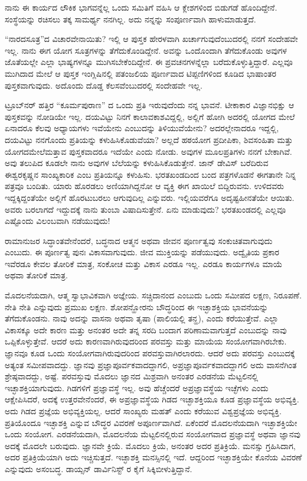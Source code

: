 ನಾನು ಈ ಕಾರ್ಯದ ಲೌಕಿಕ ಭಾಗವನ್ನೆಲ್ಲ ಒಂದು ಸಮಿತಿಗೆ ವಹಿಸಿ ಆ ಕ್ಲೇಶಗಳಿಂದ ಬಿಡುಗಡೆ ಹೊಂದಿದ್ದೇನೆ. ಸಂಸ್ಥೆಯನ್ನು ರಚಿಸಲು ತಕ್ಕ ಸಾಮರ್ಥ್ಯ ನನಗಿಲ್ಲ. ಅದು ನನ್ನನ್ನು ಸಂಪೂರ್ಣವಾಗಿ ಹಾಳುಮಾಡುತ್ತದೆ.

“ನಾರದಸೂತ್ರ”ದ ವಿಚಾರವೇನಾಯಿತು? ಇಲ್ಲಿ ಆ ಪುಸ್ತಕ ಹೇರಳವಾಗಿ ಖರ್ಚಾಗುವುದೆಂಬುದರಲ್ಲಿ ನನಗೆ ಸಂದೇಹವೇ ಇಲ್ಲ. ನಾನು ಈಗ ಯೋಗ ಸೂತ್ರಗಳನ್ನು ತೆಗೆದುಕೊಂಡಿದ್ದೇನೆ. ಅವನ್ನು ಒಂದೊಂದಾಗಿ ತೆಗೆದುಕೊಂಡು ಅವುಗಳ ಜೊತೆಯಲ್ಲೇ ಎಲ್ಲಾ ಭಾಷ್ಯಗಳನ್ನೂ ಮುಗಿಸಬೇಕೆಂದಿದ್ದೇನೆ. ಈ ಪ್ರವಚನಗಳನ್ನೆಲ್ಲಾ ಬರೆದುಕೊಳ್ಳುತ್ತಿದ್ದಾರೆ. ಎಲ್ಲವೂ ಮುಗಿದಾದ ಮೇಲೆ ಆ ಪುಸ್ತಕ ಇಂಗ್ಲಿಷಿನಲ್ಲಿ ಪತಂಜಲಿಯ ಪೂರ್ಣವಾದ ಟಿಪ್ಪಣಿಗಳಿಂದ ಕೂಡಿದ ಭಾಷಾಂತರ ಪುಸ್ತಕವಾಗುವುದು. ಅದೊಂದು ದೊಡ್ಡ ಕೆಲಸವೆಂಬುದರಲ್ಲಿ ಸಂದೇಹವೇ ಇಲ್ಲ.

ಟ್ರೂಬ್‌ನರ್‌ ಹತ್ತಿರ “ಕೂರ್ಮಪುರಾಣ” ದ ಒಂದು ಪ್ರತಿ ಇರುವುದೆಂದು ನನ್ನ ಭಾವನೆ. ಟೀಕಾಕಾರ ವಿಜ್ಞಾನಭಿಕ್ಷು ಆ ಪುಸ್ತಕವನ್ನು ನೋಡಿಯೇ ಇಲ್ಲ. ದಯವಿಟ್ಟು ನಿನಗೆ ಕಾಲಾವಕಾಶವಿದ್ದಲ್ಲಿ, ಅಲ್ಲಿಗೆ ಹೋಗಿ ಅದರಲ್ಲಿ ಯೋಗದ ಮೇಲೆ ಏನಾದರೂ ಕೆಲವು ಅಧ್ಯಾಯಗಳು ಇವೆಯೇನು ಎಂಬುದನ್ನು ತಿಳಿಯುವೆಯೇನು? ಅದರಲ್ಲೇನಾದರೂ ಇದ್ದಲ್ಲಿ, ದಯವಿಟ್ಟು ನನಗೊಂದು ಪ್ರತಿಯನ್ನು ಕಳುಹಿಸಿಕೊಡುವೆಯಾ? ಅಲ್ಲದೆ ಹಠಯೋಗ ಪ್ರದೀಪಿಕಾ, ಶಿವಸಂಹಿತಾ ಮತ್ತು ಯೋಗದಮೇಲೆಮತ್ತಾವ ಪುಸ್ತಕವಾದರೂ ಇದೆಯೇ ಎಂದು ನೋಡು. ಅವುಗಳ ಮೂಲಪ್ರತಿಗಳು ನನಗೆ ಬೇಕಾಗಿವೆ. ಅವು ತಲುಪಿದ ಕೂಡಲೇ ನಾನು ಅವುಗಳ ಬೆಲೆಯನ್ನು ಕಳುಹಿಸಿಕೊಡುತ್ತೇನೆ. ಜಾನ್ ಡೇವಿಸ್‌ ಬರೆದಿರುವ ಈಶ್ವರಕೃಷ್ಣನ ಸಾಂಖ್ಯಕಾರಿಕ ಎಂಬ ಪ್ರತಿಯನ್ನೂ ಕಳುಹಿಸು. ಭರತಖಂಡದಿಂದ ಬಂದ ಪತ್ರಗಳೊಡನೆ ಈಗತಾನೇ ನಿನ್ನ ಪತ್ರವೂ ಬಂದಿತು. ಯಾರು ಹೊರಡಲು ಅಣಿಯಾಗಿದ್ದನೋ ಆ ವ್ಯಕ್ತಿ ಈಗ ಖಾಯಿಲೆ ಬಿದ್ದಿರುವನು. ಉಳಿದವರು ಇದ್ದಕ್ಕಿದ್ದಂತೆಯೇ ಅಲ್ಲಿಗೆ ಹೊರಟುಬರಲು ಆಗುವುದಿಲ್ಲ ಎನ್ನುವರು. ಇಲ್ಲಿಯವರೆಗೂ ಅದೃಷ್ಟಹೀನತೆಯೇ ಆಯಿತು. ಅವರು ಬರಲಾಗದೆ ಇದ್ದುದಕ್ಕೆ ನಾನು ತುಂಬಾ ವಿಷಾದಿಸುತ್ತೇನೆ. ಏನು ಮಾಡುವುದು? ಭರತಖಂಡದಲ್ಲಿ ಎಲ್ಲವೂ ಎಷ್ಟೊಂದು ವಿಲಂಬವಾಗಿ ನಡೆಯುವುದು!

ರಾಮಾನುಜರ ಸಿದ್ಧಾಂತವೇನೆಂದರೆ, ಬದ್ಧನಾದ ಆತ್ಮನ ಅಥವಾ ಜೀವನ ಪೂರ್ಣತ್ವವು ಸಂಕುಚಿತವಾಗುವುದು ಎಂಬುದು. ಈ ಪೂರ್ಣತ್ವ ಪುನಃ ವಿಕಾಸವಾಗುವುದು. ಜೀವ ಮುಕ್ತಿಯನ್ನು ಪಡೆಯುವುದು. ಅದ್ವೈತಿಯ ಪ್ರಕಾರ ಇವೆರಡೂ ಕೇವಲ ತೋರಿಕೆ ಮಾತ್ರ, ಸಂಕೋಚ ಮತ್ತು ವಿಕಾಸ ಎರಡೂ ಇಲ್ಲ. ಎರಡೂ ಕಾರ್ಯಗಳೂ ಮಾಯೆ ಅಥವಾ ತೋರಿಕೆ ಮಾತ್ರ.

ಮೊದಲನೆಯದಾಗಿ, ಆತ್ಮ ಸ್ವಾಭಾವಿಕವಾಗಿ ಅಜ್ಞೇಯ. ಸಚ್ಚಿದಾನಂದ ಎಂಬುದು ಒಂದು ಸಮೀಪದ ಲಕ್ಷಣ, ನಿರೂಪಣೆ. ನೇತಿ ನೇತಿ ಎನ್ನುವುದು ಪ್ರಮುಖ ಲಕ್ಷಣ. ಶೋಪನ್ಹೋರನು ಬೌದ್ಧರಿಂದ ಈ ಇಚ್ಛಾಶಕ್ತಿಯ ಭಾವನೆಯನ್ನು ತೆಗೆದುಕೊಂಡನು. ನಾವು ಅದನ್ನು ವಾಸನಾ ಅಥವಾ ತೃಷಾ (ಪಾಲಿಯಲ್ಲಿ ತನ್ಹ), ಎಂದು ಕರೆಯುತ್ತೇವೆ. ಎಲ್ಲಾ ವಿಕಾಸಕ್ಕೂ ಅದೇ ಕಾರಣ ಮತ್ತು ಅನಂತರ ಅದೇ ತನ್ನ ಸರದಿ ಬಂದಾಗ ಪರಿಣಾಮವಾಗುತ್ತದೆ ಎಂಬುದನ್ನು ನಾವು ಒಪ್ಪಿಕೊಳ್ಳುತ್ತೇವೆ. ಆದರೆ ಅದು ಕಾರಣವಾಗಿರುವುದರಿಂದ ಪರವಸ್ತು ಮತ್ತು ಮಾಯೆಯ ಸಂಯೋಗವಾಗಿರಬೇಕು. ಜ್ಞಾನವೂ ಕೂಡ ಒಂದು ಸಂಯೋಗವಾಗಿರುವುದರಿಂದ ಪರವಸ್ತುವಾಗಿರಲಾರದು. ಆದರೆ ಅದು ಪರವಸ್ತು ಎಂಬುದಕ್ಕೆ ಅತ್ಯಂತ ಸಮೀಪವಾದದ್ದು. ಜ್ಞಾನವು ಪ್ರಜ್ಞಾಪೂರ್ವಕವಾದದ್ದಾಗಲಿ, ಅಪ್ರಜ್ಞಾಪೂರ್ವಕವಾದದ್ದಾಗಲಿ ಅದು ವಾಸನೆಗಿಂತ ಶ್ರೇಷ್ಠವಾದದ್ದು, ಅಷ್ಟೆ. ಪರವಸ್ತುವು ಮೊದಲು ಜ್ಞಾನದ ಮಿಶ್ರವಾಗಿ ಅನಂತರ ಎರಡನೆಯ ಮೆಟ್ಟಲಿನಲ್ಲಿ ಇಚ್ಛಾಶಕ್ತಿಯಾಗುವುದು. ಗಿಡಗಳಿಗೆ ಪ್ರಜ್ಞಾವಸ್ಥೆ ಇಲ್ಲ. ಅವು ಹೆಚ್ಚೆಂದರೆ ಅಪ್ರಜ್ಞಾವಸ್ಥೆಯ ಇಚ್ಛೆಗಳು ಎಂದು ಆಕ್ಷೇಪಿಸಿದರೆ, ಅದಕ್ಕೆ ಉತ್ತರವೇನೆಂದರೆ, ಈ ಅಪ್ರಜ್ಞಾವಸ್ಥೆಯ ಗಿಡದ ಇಚ್ಛಾಶಕ್ತಿಯೂ ಕೂಡ ಪ್ರಜ್ಞಾವಸ್ಥೆಯ ಅಭಿವ್ಯಕ್ತಿ. ಅದು ಗಿಡದ ಪ್ರಜ್ಞೆಯ ಅಭಿವ್ಯಕ್ತಿಯಲ್ಲ. ಆದರೆ ಸಾಂಖ್ಯರು ಮಹತ್ ಎಂದು ಕರೆಯುವ ವಿಶ್ವಪ್ರಜ್ಞೆಯ ಅಭಿವ್ಯಕ್ತಿ. ಪ್ರತಿಯೊಂದೂ ಇಚ್ಛಾಶಕ್ತಿ ಎನ್ನುವ ಬೌದ್ಧರ ವಿವರಣೆ ಅಪೂರ್ಣವಾಗಿದೆ. ಏಕೆಂದರೆ ಮೊದಲನೆಯದಾಗಿ ಇಚ್ಛಾಶಕ್ತಿಯೇ ಒಂದು ಸಂಯೋಗ. ಎರಡನೆಯದಾಗಿ, ಮೊದಲನೆಯ ಮೆಟ್ಟಲಿನಲ್ಲಿರುವ ಸಂಯೋಗವಾದ ಪ್ರಜ್ಞಾವಸ್ಥೆ ಅಥವಾ ಜ್ಞಾನವು ಅದಕ್ಕೆ ಮೊದಲೇ ಬರುವುದು. ಜ್ಞಾನವೇ ಕ್ರಿಯೆ. ಮೊದಲು ಕ್ರಿಯೆ, ಅನಂತರ ಅದರ ಪ್ರತಿಕ್ರಿಯೆ. ಮನಸ್ಸು ಗ್ರಹಿಸಿದಾಗ, ಅದರ ಪ್ರತಿಕ್ರಿಯೆಯಾಗಿ ಅದು ಇಚ್ಚಿಸುತ್ತದೆ. ಇಚ್ಛಾಶಕ್ತಿ ಮನಸ್ಸಿನಲ್ಲಿ ಇದೆ. ಆದ್ದರಿಂದ ಇಚ್ಛಾಶಕ್ತಿಯೇ ಕೊನೆಯ ವಿವರಣೆ ಎನ್ನುವುದು ಅಸಂಬದ್ಧ. ಡಾಯ್ಸನ್ ಡಾರ್ವಿನಿಸ್ಟ್ ರ ಕೈಗೆ ಸಿಕ್ಕಿಬೀಳುತ್ತಿದ್ದಾನೆ.

